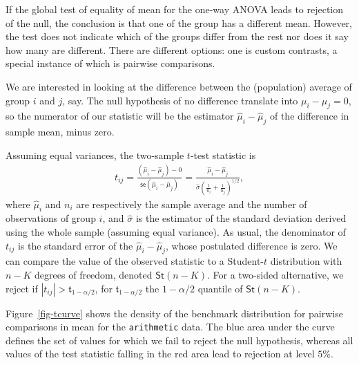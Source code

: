 \documentclass[
  11pt,
  letterpaper,
]{scrbook}
\theoremstyle{definition}
\theoremstyle{remark}
\begin{document}
If the global test of equality of mean for the one-way ANOVA leads to
rejection of the null, the conclusion is that one of the group has a
different mean. However, the test does not indicate which of the groups
differ from the rest nor does it say how many are different. There are
different options: one is custom contrasts, a special instance of which
is pairwise comparisons.

We are interested in looking at the difference between the (population)
average of group \(i\) and \(j\), say. The null hypothesis of no
difference translate into \(\mu_i-\mu_j=0\), so the numerator of our
statistic will be the estimator \(\widehat{\mu}_i - \widehat{\mu}_j\) of
the difference in sample mean, minus zero.

Assuming equal variances, the two-sample \(t\)-test statistic is
\begin{align*}
t_{ij} = \frac{(\widehat{\mu}_i - \widehat{\mu}_j) - 0}{\mathsf{se}(\widehat{\mu}_i - \widehat{\mu}_j)} =\frac{\widehat{\mu}_i - \widehat{\mu}_j}{\widehat{\sigma} \left(\frac{1}{n_i} + \frac{1}{n_j}\right)^{1/2}},
\end{align*} where \(\widehat{\mu}_i\) and \(n_i\) are respectively the
sample average and the number of observations of group \(i\), and
\(\widehat{\sigma}\) is the estimator of the standard deviation derived
using the whole sample (assuming equal variance). As usual, the
denominator of \(t_{ij}\) is the standard error of the
\(\widehat{\mu}_i - \widehat{\mu}_j\), whose postulated difference is
zero. We can compare the value of the observed statistic to a
Student-\(t\) distribution with \(n-K\) degrees of freedom, denoted
\(\mathsf{St}(n-K)\). For a two-sided alternative, we reject if
\(|t_{ij}| > \mathfrak{t}_{1-\alpha/2}\), for
\(\mathfrak{t}_{1-\alpha/2}\) the \(1-\alpha/2\) quantile of
\(\mathsf{St}(n-K)\).

Figure~\ref{fig-tcurve} shows the density of the benchmark distribution
for pairwise comparisons in mean for the \texttt{arithmetic} data. The
blue area under the curve defines the set of values for which we fail to
reject the null hypothesis, whereas all values of the test statistic
falling in the red area lead to rejection at level \(5\)\%.
\end{document}
